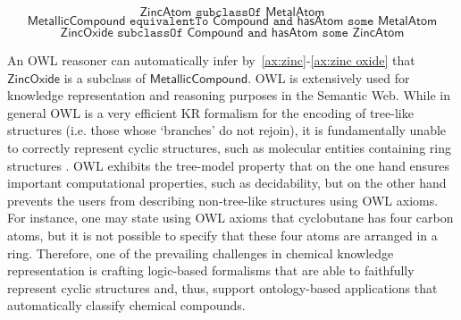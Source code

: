 \documentclass[10pt]{bmc_article}
\newenvironment{bmcformat}{\baselineskip20pt\sloppy\setboolean{publ}{false}}{\baselineskip20pt\sloppy}
\begin{document}
\begin{bmcformat}
\begin{equation} \label{ax:zinc}\mathsf{ZincAtom} \texttt{ subclassOf } \mathsf{MetalAtom}\end{equation} 
\begin{equation}\label{ax:metallic compound}\mathsf{MetallicCompound} \texttt{ equivalentTo } \mathsf{Compound} \texttt{ and } \mathsf{hasAtom} \texttt{ some } \mathsf{MetalAtom}\end{equation}
\begin{equation}\label{ax:zinc oxide} \mathsf{ZincOxide} \texttt{ subclassOf } \mathsf{Compound} \texttt{ and } \mathsf{hasAtom}  \texttt{ some } \mathsf{ZincAtom}\end{equation} 
 
An OWL reasoner can automatically infer by~\eqref{ax:zinc}-\eqref{ax:zinc oxide}  that $\mathsf{ZincOxide}$ is a subclass of $\mathsf{MetallicCompound}$.
OWL is extensively used for knowledge representation and reasoning purposes in the Semantic Web. %
While in general OWL is a very efficient KR formalism for the encoding of tree-like structures (i.e. those whose `branches' do not rejoin), it is fundamentally unable to correctly represent cyclic structures, such as molecular entities containing ring structures \cite{magka2011}.
OWL exhibits the tree-model property \cite{VardiModalLogic} that on the one hand ensures important computational properties, such as decidability, but on the other hand prevents the users from describing non-tree-like structures using OWL axioms. For instance, one may state using OWL axioms that cyclobutane has four carbon atoms, but it is not possible to specify that these four atoms are arranged in a ring. Therefore, one of the prevailing challenges in chemical knowledge representation is crafting logic-based formalisms that are able to faithfully represent cyclic structures and, thus, support ontology-based applications that automatically classify chemical compounds.


\end{bmcformat}
\end{document}
